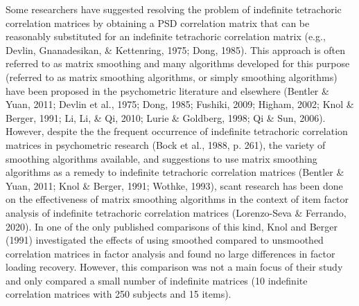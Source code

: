 \documentclass[
  english,
  man]{apa6}
\begin{document}
Some researchers have suggested resolving the problem of indefinite tetrachoric correlation matrices by obtaining a PSD correlation matrix that can be reasonably substituted for an indefinite tetrachoric correlation matrix (e.g., Devlin, Gnanadesikan, \& Kettenring, 1975; Dong, 1985). This approach is often referred to as matrix smoothing and many algorithms developed for this purpose (referred to as matrix smoothing algorithms, or simply smoothing algorithms) have been proposed in the psychometric literature and elsewhere (Bentler \& Yuan, 2011; Devlin et al., 1975; Dong, 1985; Fushiki, 2009; Higham, 2002; Knol \& Berger, 1991; Li, Li, \& Qi, 2010; Lurie \& Goldberg, 1998; Qi \& Sun, 2006). However, despite the the frequent occurrence of indefinite tetrachoric correlation matrices in psychometric research (Bock et al., 1988, p. 261), the variety of smoothing algorithms available, and suggestions to use matrix smoothing algorithms as a remedy to indefinite tetrachoric correlation matrices (Bentler \& Yuan, 2011; Knol \& Berger, 1991; Wothke, 1993), scant research has been done on the effectiveness of matrix smoothing algorithms in the context of item factor analysis of indefinite tetrachoric correlation matrices (Lorenzo-Seva \& Ferrando, 2020). In one of the only published comparisons of this kind, Knol and Berger (1991) investigated the effects of using smoothed compared to unsmoothed correlation matrices in factor analysis and found no large differences in factor loading recovery. However, this comparison was not a main focus of their study and only compared a small number of indefinite matrices (10 indefinite correlation matrices with 250 subjects and 15 items).
\end{document}
